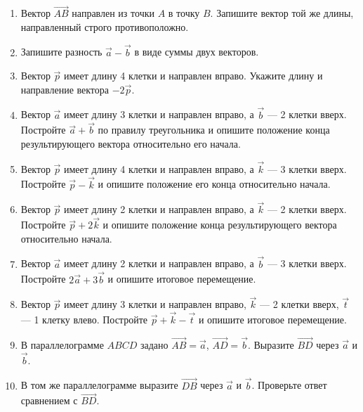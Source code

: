 \documentclass[a4paper,12pt]{article}
\newcommand{\vect}[1]{\overrightarrow{#1}}
\begin{document}
\begin{enumerate}[label=\textbf{\arabic*.}]
  \item Вектор $\vect{AB}$ направлен из точки $A$ в точку $B$. Запишите вектор той же длины, направленный строго противоположно.

  \item Запишите разность $\vec a-\vec b$ в виде суммы двух векторов.

  \item Вектор $\vec p$ имеет длину 4 клетки и направлен вправо. Укажите длину и направление вектора $-2\vec p$.

  \item Вектор $\vec a$ имеет длину 3 клетки и направлен вправо, а $\vec b$ --- 2 клетки вверх. Постройте $\vec a+\vec b$ по правилу треугольника и опишите положение конца результирующего вектора относительно его начала.

  \item Вектор $\vec p$ имеет длину 4 клетки и направлен вправо, а $\vec k$ --- 3 клетки вверх. Постройте $\vec p-\vec k$ и опишите положение его конца относительно начала.

  \item Вектор $\vec p$ имеет длину 2 клетки и направлен вправо, а $\vec k$ --- 2 клетки вверх. Постройте $\vec p+2\vec k$ и опишите положение конца результирующего вектора относительно начала.

  \item Вектор $\vec a$ имеет длину 2 клетки и направлен вправо, а $\vec b$ --- 3 клетки вверх. Постройте $2\vec a+3\vec b$ и опишите итоговое перемещение.

  \item Вектор $\vec p$ имеет длину 3 клетки и направлен вправо, $\vec k$ --- 2 клетки вверх, $\vec t$ --- 1 клетку влево. Постройте $\vec p+\vec k-\vec t$ и опишите итоговое перемещение.

  \item В параллелограмме $ABCD$ задано $\vect{AB}=\vec a$, $\vect{AD}=\vec b$. Выразите $\vect{BD}$ через $\vec a$ и $\vec b$.

  \item В том же параллелограмме выразите $\vect{DB}$ через $\vec a$ и $\vec b$. Проверьте ответ сравнением с $\vect{BD}$.
\end{enumerate}

\clearpage
\end{document}

